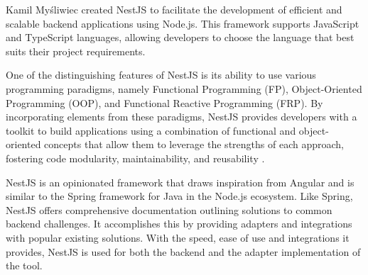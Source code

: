 Kamil Myśliwiec created NestJS  to facilitate the development of
efficient and scalable backend applications using Node.js. This framework
supports JavaScript and TypeScript languages, allowing developers to choose the
language that best suits their project requirements.

One of the distinguishing features of NestJS is its ability to use various
programming paradigms, namely Functional Programming (FP), Object-Oriented
Programming (OOP), and Functional Reactive Programming (FRP). By incorporating
elements from these paradigms, NestJS provides developers with a toolkit to
build applications using a combination of functional and object-oriented
concepts that allow them to leverage the strengths of each approach, fostering
code modularity, maintainability, and reusability .

NestJS is an opinionated framework that draws inspiration from Angular and is
similar to the Spring framework for Java in the Node.js ecosystem. Like Spring,
NestJS offers comprehensive documentation outlining solutions to common backend
challenges. It accomplishes this by providing adapters and integrations with
popular existing solutions. With the speed, ease of use and integrations it
provides, NestJS is used for both the backend and the adapter implementation of
the tool.

